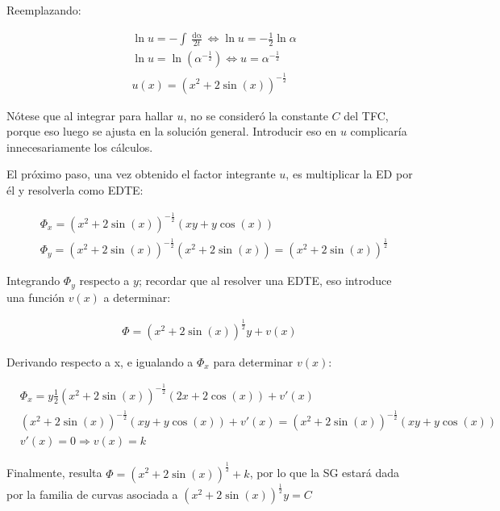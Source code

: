 \documentclass{article}
\begin{document}
Reemplazando:

\begin{subequations}
\begin{align}
& \ln u = -\int \frac{\mathop{d\alpha}}{2 t} \Leftrightarrow \ln u = -\frac{1}{2} \ln \alpha \\
& \ln u = \ln (\alpha^{-\frac{1}{2}}) \Leftrightarrow u = \alpha^{-\frac{1}{2}} \\
& u(x) = (x^2 + 2 \sin(x))^{-\frac{1}{2}}
\end{align}
\end{subequations}

Nótese que al integrar para hallar $u$, no se consideró la constante $C$ del TFC, porque eso luego se ajusta en la solución general. Introducir eso en $u$ complicaría innecesariamente los cálculos.

El próximo paso, una vez obtenido el factor integrante $u$, es multiplicar la ED por él y resolverla como EDTE:

\begin{subequations}
\begin{align}
& \Phi_x = (x^2 + 2 \sin(x))^{-\frac{1}{2}} (x y + y \cos(x) ) \\
& \Phi_y = (x^2 + 2 \sin(x))^{-\frac{1}{2}} (x^2 + 2 \sin(x)) = (x^2 + 2 \sin(x))^{\frac{1}{2}}
\end{align}
\end{subequations}

Integrando $\Phi_y$ respecto a $y$; recordar que al resolver una EDTE, eso introduce una función $v(x)$ a determinar:

\begin{align}
\Phi = (x^2 + 2 \sin(x))^{\frac{1}{2}} y + v(x)
\end{align}

Derivando respecto a x, e igualando a $\Phi_x$ para determinar $v(x)$:

\begin{subequations}
\begin{align}
& \Phi_x = y \frac{1}{2} (x^2 + 2 \sin(x))^{-\frac{1}{2}} (2 x + 2 \cos(x)) + v'(x) \\
& (x^2 + 2 \sin(x))^{-\frac{1}{2}} (x y + y \cos(x)) + v'(x) = (x^2 + 2 \sin(x))^{-\frac{1}{2}} (x y + y \cos(x)) \\
& v'(x) = 0 \Rightarrow v(x) = k
\end{align}
\end{subequations}

Finalmente, resulta $\Phi = (x^2 + 2 \sin(x))^{\frac{1}{2}} + k$, por lo que la SG estará dada por la familia de curvas asociada a $(x^2 + 2 \sin(x))^{\frac{1}{2}} y = C$
\end{document}
